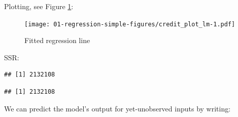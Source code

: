 \documentclass[10pt,b5paper,krantz1]{krantz}
\newenvironment{Shaded}{\begin{snugshade}}{\end{snugshade}}
\newcommand{\CommentTok}[1]{\textcolor[rgb]{0.37,0.37,0.37}{\textit{#1}}}
\newcommand{\DataTypeTok}[1]{\textcolor[rgb]{0.27,0.27,0.27}{#1}}
\newcommand{\DecValTok}[1]{\textcolor[rgb]{0.06,0.06,0.06}{#1}}
\newcommand{\KeywordTok}[1]{\textcolor[rgb]{0.27,0.27,0.27}{\textbf{#1}}}
\newcommand{\NormalTok}[1]{#1}
\newcommand{\OperatorTok}[1]{\textcolor[rgb]{0.43,0.43,0.43}{\textbf{#1}}}
\newcommand{\StringTok}[1]{\textcolor[rgb]{0.5,0.5,0.5}{#1}}
\begin{document}
Plotting, see Figure \ref{fig:credit_plot_lm}:

\begin{Shaded}
\end{Shaded}

\begin{figure}
\hypertarget{fig:credit_plot_lm}{%
\centering
\texttt{[image: 01-regression-simple-figures/credit\_plot\_lm-1.pdf]}
\caption{Fitted regression line}\label{fig:credit_plot_lm}
}
\end{figure}

SSR:

\begin{Shaded}
\end{Shaded}

\begin{verbatim}
## [1] 2132108
\end{verbatim}

\begin{Shaded}
\end{Shaded}

\begin{verbatim}
## [1] 2132108
\end{verbatim}

We can predict the model's output for yet-unobserved inputs by
writing:

\begin{Shaded}
\end{Shaded}
\end{document}
